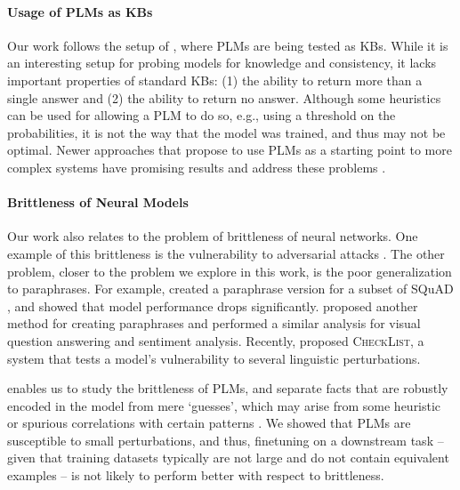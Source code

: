 \paragraph{Usage of PLMs as KBs}
Our work follows the setup of \citet{lama,alpaqa}, where PLMs are being tested as KBs. While it is an interesting setup for probing models for knowledge and consistency, it lacks important properties of standard KBs: (1) the ability to return more than a single answer and (2) the ability to return no answer.
Although some heuristics can be used for allowing a PLM to do so, e.g., using a threshold on the probabilities, it is not the way that the model was trained, and thus may not be optimal.
Newer approaches that propose to use PLMs as a starting point to more complex systems have promising results and address these  problems \cite{thorne2020neural}.


\paragraph{Brittleness of Neural Models}
Our work also relates to the problem of brittleness of neural networks. One example of this brittleness is the vulnerability to adversarial attacks \cite{adversarial_attacks,jia2017adversarial}.
The other problem, closer to the problem we explore in this work, is the poor generalization to paraphrases.
For example, \citet{squad-paraphrase} created a paraphrase version for a subset of SQuAD \cite{squad}, and showed that model performance drops significantly. 
\citet{ribeiro2018semantically} proposed another method for
creating paraphrases and performed a similar analysis for
visual question answering and sentiment analysis. Recently,
\citet{ribeiro-etal-2020-beyond} proposed
\textsc{CheckList}, a system that tests a model's vulnerability to several linguistic perturbations.

\resource{} enables us to study the brittleness of PLMs, and
separate  facts that are robustly encoded in the model from
mere `guesses', which may arise from some heuristic or
spurious correlations with certain patterns
\cite{poerner2020bert}. We showed that PLMs are susceptible
to small perturbations, and thus, finetuning on a
downstream task -- given that training datasets  typically are not
large and  do not contain equivalent examples -- is not
likely to perform better with respect to brittleness.


